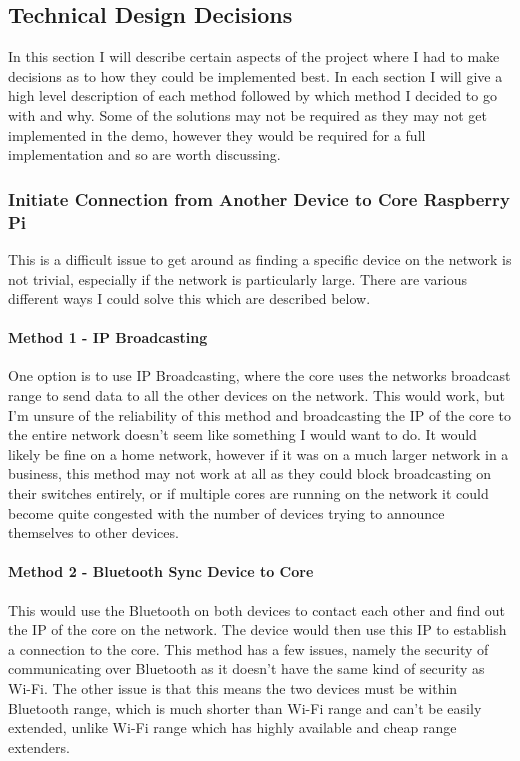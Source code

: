 \subsection{Technical Design Decisions}
In this section I will describe certain aspects of the project where I had to make decisions as to how they could be implemented best. In each section I will give a high level description of each method followed by which method I decided to go with and why. Some of the solutions may not be required as they may not get implemented in the demo, however they would be required for a full implementation and so are worth discussing.

\subsubsection*{Initiate Connection from Another Device to Core Raspberry Pi}
This is a difficult issue to get around as finding a specific device on the network is not trivial, especially if the network is particularly large. There are various different ways I could solve this which are described below.

\paragraph*{Method 1 - IP Broadcasting} One option is to use IP Broadcasting, where the core uses the networks broadcast range to send data to all the other devices on the network. This would work, but I'm unsure of the reliability of this method and broadcasting the IP of the core to the entire network doesn't seem like something I would want to do. It would likely be fine on a home network, however if it was on a much larger network in a business, this method may not work at all as they could block broadcasting on their switches entirely, or if multiple cores are running on the network it could become quite congested with the number of devices trying to announce themselves to other devices.

\paragraph*{Method 2 - Bluetooth Sync Device to Core} This would use the Bluetooth on both devices to contact each other and find out the IP of the core on the network. The device would then use this IP to establish a connection to the core. This method has a few issues, namely the security of communicating over Bluetooth as it doesn't have the same kind of security as Wi-Fi. The other issue is that this means the two devices must be within Bluetooth range, which is much shorter than Wi-Fi range and can't be easily extended, unlike Wi-Fi range which has highly available and cheap range extenders.

